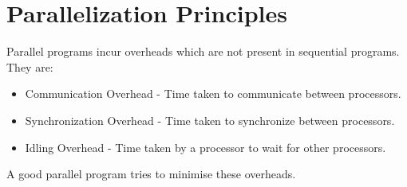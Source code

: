 \documentclass[12pt]{book}
\begin{document}
\newpage

\section{Parallelization Principles}
Parallel programs incur overheads which are not present in sequential programs. They are:
\begin{itemize}
    \item Communication Overhead - Time taken to communicate between processors.
    \item Synchronization Overhead - Time taken to synchronize between processors.
    \item Idling Overhead - Time taken by a processor to wait for other processors.
\end{itemize}
A good parallel program tries to minimise these overheads.
\end{document}
